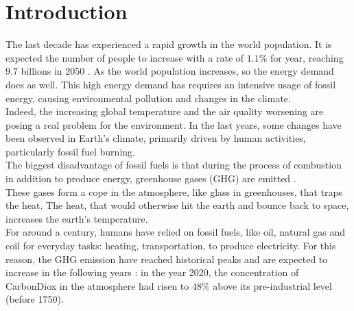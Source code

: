 \chapter{Introduction}

%
The last decade has experienced a rapid growth in the world population. It is expected the number of people to increase with a rate of $1.1\%$ for year, reaching $9.7$ billions in 2050 \cite{wpp}. As the world population increases, so the energy demand does as well. 
This high energy demand has requires an intensive usage of fossil energy, causing environmental pollution and changes in the climate.\\ 
Indeed, the increasing global temperature and the air quality worsening are posing a real problem for the environment. In the last years, some changes have been observed in Earth’s climate, primarily driven by human activities, particularly fossil fuel burning. \\

The biggest disadvantage of fossil fuels is that during the process of combustion in addition to produce energy, greenhouse gases (\gls{GHG}) are emitted \cite{greenhousegasemissions}. \\
These gases form a cope in the atmosphere, like glass in greenhouses, that traps the heat. The heat, that would otherwise hit the earth and bounce back to space, increases the earth's temperature. \\
For around a century, humans have relied on fossil fuels, like oil, natural gas and coil for everyday tasks: heating, transportation, to produce electricity. For this reason, the \gls{GHG} emission have reached historical peaks and are expected to increase in the following years \cite{co2predic}: in the year 2020, the concentration of \gls{CarbonDiox} in the atmosphere had risen to $48\%$ above its pre-industrial level (before 1750). \\

